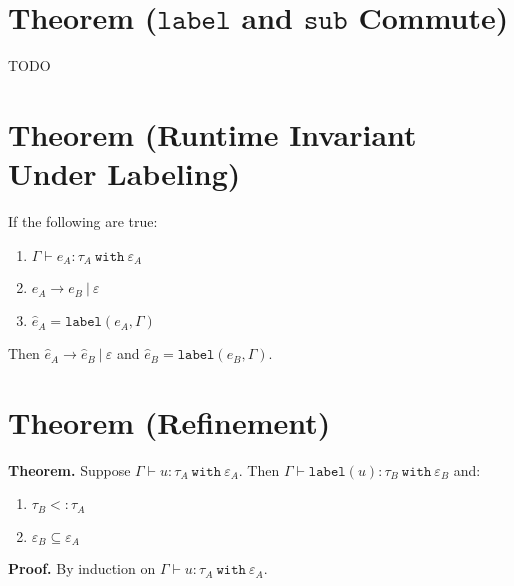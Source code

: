 \documentclass{llncs}
\newcommand{\keywadj}[1]{\mathtt{#1}}
\newcommand{\keyw}[1]{\keywadj{#1}~}
\newcommand{\kwa}[1]{\keywadj{ #1 }}
\newcommand{\type}[2]{
	#1~\keyw{with} #2
}
\begin{document}
\section{Theorem ($\kwa{label}$ and $\kwa{sub}$ Commute)}

TODO









\section{Theorem (Runtime Invariant Under Labeling)}

If the following are true:
	\begin{enumerate}
	\item $\Gamma \vdash e_A : \type{\tau_A}{\varepsilon_A}$
	\item $e_A \longrightarrow e_B~|~\varepsilon$
	\item $\hat e_A = \keywadj{label}(e_A, \Gamma)$
	\end{enumerate}
Then $\hat e_A \longrightarrow \hat e_B~|~\varepsilon$ and $\hat e_B = \keywadj{label}(e_B, \Gamma)$.









\section{Theorem (Refinement)}

\textbf{Theorem.} Suppose $\Gamma \vdash u : \tau_A~\kwa{with}~\varepsilon_A$. Then $\Gamma \vdash \kwa{label}(u) : \type{\tau_B}{\varepsilon_B}$ and:
\begin{enumerate}
	\item $\tau_B <: \tau_A$
	\item $\varepsilon_B \subseteq \varepsilon_A$
\end{enumerate}

\noindent
\textbf{Proof.} By induction on $\Gamma \vdash u : \type{\tau_A}{\varepsilon_A}$.\\
\end{document}

